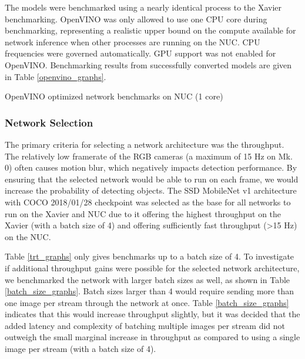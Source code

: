 The models were benchmarked using a nearly identical process to the Xavier benchmarking. OpenVINO was only allowed to use one CPU core during benchmarking, representing a realistic upper bound on the compute available for network inference when other processes are running on the NUC. CPU frequencies were governed automatically. GPU support was not enabled for OpenVINO. Benchmarking results from successfully converted models are given in Table \ref{openvino_graphs}.

\begin{table}
	\centering
	\begin{adjustbox}{max width=.95\textwidth}
	\end{adjustbox}
	\caption{OpenVINO optimized network benchmarks on NUC (1 core)}
	\label{openvino_graphs}
\end{table}

\subsubsection{Network Selection}

The primary criteria for selecting a network architecture was the throughput. The relatively low framerate of the RGB cameras (a maximum of 15 Hz on Mk. 0) often causes motion blur, which negatively impacts detection performance. By ensuring that the selected network would be able to run on each frame, we would increase the probability of detecting objects. The SSD MobileNet v1 architecture with COCO 2018/01/28 checkpoint was selected as the base for all networks to run on the Xavier and NUC due to it offering the highest throughput on the Xavier (with a batch size of 4) and offering sufficiently fast throughput (>15 Hz) on the NUC.

Table \ref{trt_graphs} only gives benchmarks up to a batch size of 4. To investigate if additional throughput gains were possible for the selected network architecture, we benchmarked the network with larger batch sizes as well, as shown in Table \ref{batch_size_graphs}. Batch sizes larger than 4 would require sending more than one image per stream through the network at once. Table \ref{batch_size_graphs} indicates that this would increase throughput slightly, but it was decided that the added latency and complexity of batching multiple images per stream did not outweigh the small marginal increase in throughput as compared to using a single image per stream (with a batch size of 4).

